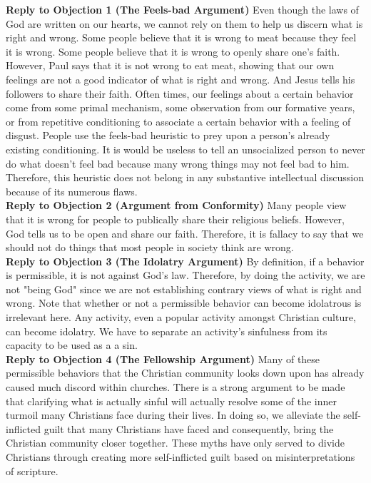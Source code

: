 \documentclass[a4paper, parskip=full, 12spt]{article}
\begin{document}
\textbf{Reply to Objection 1 (The Feels-bad Argument)} Even though the laws of God are written on our hearts, we cannot rely on them to help us discern what is right and wrong. Some people believe that it is wrong to meat because they feel it is wrong. Some people believe that it is wrong to openly share one's faith. However, Paul says that it is not wrong to eat meat, showing that our own feelings are not a good indicator of what is right and wrong. And Jesus tells his followers to share their faith. Often times, our feelings about a certain behavior come from some primal mechanism, some observation from our formative years, or from repetitive conditioning to associate a certain behavior with a feeling of disgust. People use the feels-bad heuristic to prey upon a person's already existing conditioning. It is would be useless to tell an unsocialized person to never do what doesn't feel bad because many wrong things may not feel bad to him. Therefore, this heuristic does not belong in any substantive intellectual discussion because of its numerous flaws. \\
\textbf{Reply to Objection 2 (Argument from Conformity)} Many people view that it is wrong for people to publically share their religious beliefs. However, God tells us to be open and share our faith. Therefore, it is fallacy to say that we should not do things that most people in society think are wrong. \\
\textbf{Reply to Objection 3 (The Idolatry Argument)} By definition, if a behavior is permissible, it is not against God's law. Therefore, by doing the activity, we are not "being God" since we are not establishing contrary views of what is right and wrong. Note that whether or not a permissible behavior can become idolatrous is irrelevant here. Any activity, even a popular activity amongst Christian culture, can become idolatry. We have to separate an activity's sinfulness from its capacity to be used as a a sin. \\
\textbf{Reply to Objection 4 (The Fellowship Argument)} Many of these permissible behaviors that the Christian community looks down upon has already caused much discord within churches. There is a strong argument to be made that clarifying what is actually sinful will actually resolve some of the inner turmoil many Christians face during their lives. In doing so, we alleviate the self-inflicted guilt that many Christians have faced and consequently, bring the Christian community closer together. These myths have only served to divide Christians through creating more self-inflicted guilt based on misinterpretations of scripture. \\
\end{document}
